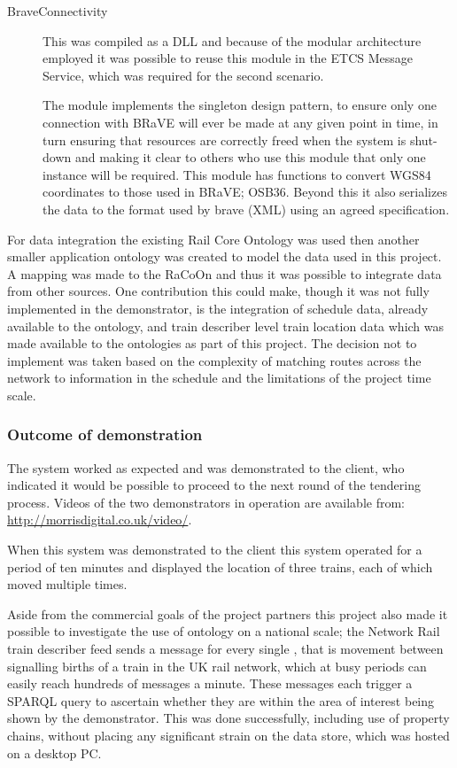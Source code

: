 \begin{description}
    \item[BraveConnectivity] This was compiled as a DLL and because of the modular architecture employed it was possible to reuse this module in the ETCS Message Service, which was required for the second scenario.

    The module implements the singleton design pattern, to ensure only one connection with BRaVE will ever be made at any given point in time, in turn ensuring that resources are correctly freed when the system is shut-down and making it clear to others who use this module that only one instance will be required. This module has functions to convert WGS84 coordinates to those used in BRaVE; OSB36. Beyond this it also serializes the data to the format used by brave (XML) using an agreed specification. 

    
\end{description}

For data integration the existing Rail Core Ontology was used then another smaller application ontology was created to model the data used in this project. A mapping was made to the RaCoOn and thus it was possible to integrate data from other sources. One contribution this could make, though it was not fully implemented in the demonstrator, is the integration of schedule data, already available to the ontology, and train describer level train location data which was made available to the ontologies as part of this project. The decision not to implement was taken based on the complexity of matching routes across the network to information in the schedule and the limitations of the project time scale.

\subsubsection{Outcome of demonstration}
The system worked as expected and was demonstrated to the client, who indicated it would be possible to proceed to the next round of the tendering process.
Videos of the two demonstrators in operation are available from: \url{http://morrisdigital.co.uk/video/}.

When this system was demonstrated to the client this system operated for a period of ten minutes and displayed the location of three trains, each of which moved multiple times.

Aside from the commercial goals of the project partners this project also made it possible to investigate the use of ontology on a national scale; the Network Rail train describer feed sends a message for every single , that is movement between signalling births of a train in the UK rail network, which at busy periods can easily reach hundreds of messages a minute. These messages each trigger a SPARQL query to ascertain whether they are within the area of interest being shown by the demonstrator. This was done successfully, including use of property chains, without placing any significant strain on the data store, which was hosted on a desktop PC.

